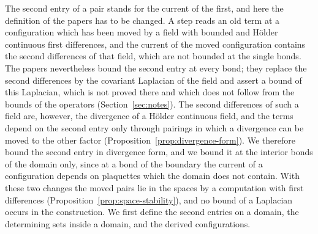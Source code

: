 \documentclass[11pt]{preprint}
\numberwithin{equation}{section}
\begin{document}
The second entry of a pair stands for the current of the first, and here the definition of the papers has to be changed. A step reads an old term at a configuration which has been moved by a field with bounded and H\"older continuous first differences, and the current of the moved configuration contains the second differences of that field, which are not bounded at the single bonds. The papers nevertheless bound the second entry at every bond; they replace the second differences by the covariant Laplacian of the field and assert a bound of this Laplacian, which is not proved there and which does not follow from the bounds of the operators (Section~\ref{sec:notes}). The second differences of such a field are, however, the divergence of a H\"older continuous field, and the terms depend on the second entry only through pairings in which a divergence can be moved to the other factor (Proposition~\ref{prop:divergence-form}). We therefore bound the second entry in divergence form, and we bound it at the interior bonds of the domain only, since at a bond of the boundary the current of a configuration depends on plaquettes which the domain does not contain. With these two changes the moved pairs lie in the spaces by a computation with first differences (Proposition~\ref{prop:space-stability}), and no bound of a Laplacian occurs in the construction. We first define the second entries on a domain, the determining sets inside a domain, and the derived configurations.
\end{document}
